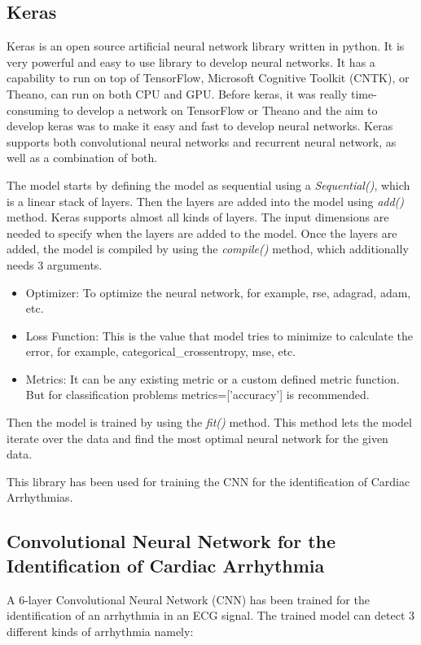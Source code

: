 \subsection{Keras}

Keras is an open source artificial neural network library written in python. It is very powerful and easy to use library to develop neural networks. It has a capability to run on top of TensorFlow, Microsoft Cognitive Toolkit (CNTK), or Theano, can run on both CPU and GPU. Before keras, it was really time-consuming to develop a network on TensorFlow or Theano and the aim to develop keras was to make it easy and fast to develop neural networks. Keras supports both convolutional neural networks and recurrent neural network, as well as a combination of both.

The model starts by defining the model as sequential using a \textit{Sequential()}, which is a linear stack of layers. Then the layers are added into the model using \textit{add()} method. Keras supports almost all kinds of layers. The input dimensions are needed to specify when the layers are added to the model. Once the layers are added, the model is compiled by using the \textit{compile()} method, which additionally needs 3 arguments.

\begin{itemize}
	\item Optimizer: To optimize the neural network, for example, rse, adagrad, adam, etc.
	\item Loss Function: This is the value that model tries to minimize to calculate the error, for example, categorical\_crossentropy, mse, etc.
	\item Metrics: It can be any existing metric or a custom defined metric function. But for classification problems metrics=['accuracy'] is recommended.
\end{itemize}

Then the model is trained by using the \textit{fit()} method. This method lets the model iterate over the data and find the most optimal neural network for the given data.

This library has been used for training the CNN for the identification of Cardiac Arrhythmias.

\subsection{Convolutional Neural Network for the Identification of Cardiac Arrhythmia}
A 6-layer Convolutional Neural Network (CNN) has been trained for the identification of an arrhythmia in an ECG signal. The trained model can detect 3 different kinds of arrhythmia namely:

